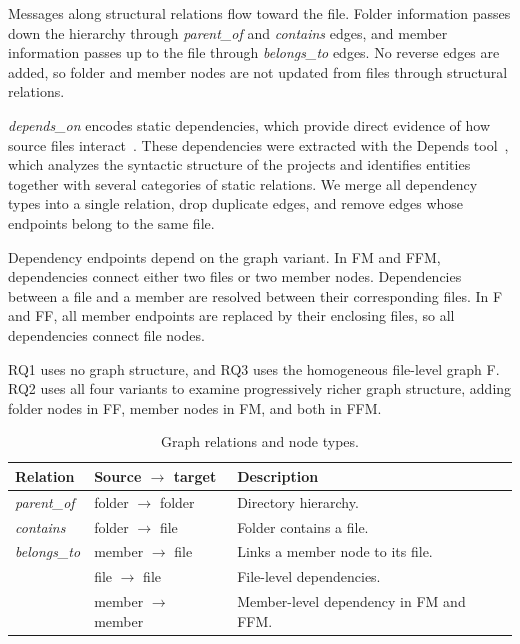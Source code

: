 Messages along structural relations flow toward the file. Folder information passes down the hierarchy through \emph{parent\_of} and \emph{contains} edges, and member information passes up to the file through \emph{belongs\_to} edges. No reverse edges are added, so folder and member nodes are not updated from files through structural relations.

\emph{depends\_on} encodes static dependencies, which provide direct evidence of how source files interact~\cite{negar, deps_impact}. These dependencies were extracted with the Depends tool~\cite{depends}, which analyzes the syntactic structure of the projects and identifies entities together with several categories of static relations. We merge all dependency types into a single relation, drop duplicate edges, and remove edges whose endpoints belong to the same file.

Dependency endpoints depend on the graph variant. In FM and FFM, dependencies connect either two files or two member nodes. Dependencies between a file and a member are resolved between their corresponding files. In F and FF, all member endpoints are replaced by their enclosing files, so all dependencies connect file nodes.

RQ1 uses no graph structure, and RQ3 uses the homogeneous file-level graph F. RQ2 uses all four variants to examine progressively richer graph structure, adding folder nodes in FF, member nodes in FM, and both in FFM.

\begin{table}[t]
\centering
\caption{Graph relations and node types.}
\label{tab:relation_types}
\renewcommand{\arraystretch}{1.1}
\begin{tabularx}{\columnwidth}{@{}l l >{\raggedright\arraybackslash}X@{}}
\toprule
Relation & Source $\to$ target & Description \\
\midrule
\emph{parent\_of}
& folder $\to$ folder
& Directory hierarchy. \\
\emph{contains}
& folder $\to$ file
& Folder contains a file. \\
\emph{belongs\_to}
& member $\to$ file
& Links a member node to its file. \\
\addlinespace[4pt]
\multirow{2}{*}{\emph{depends\_on}}
& file $\to$ file
& File-level dependencies. \\
& member $\to$ member
& Member-level dependency in FM and FFM. \\
\bottomrule
\end{tabularx}
\end{table}

